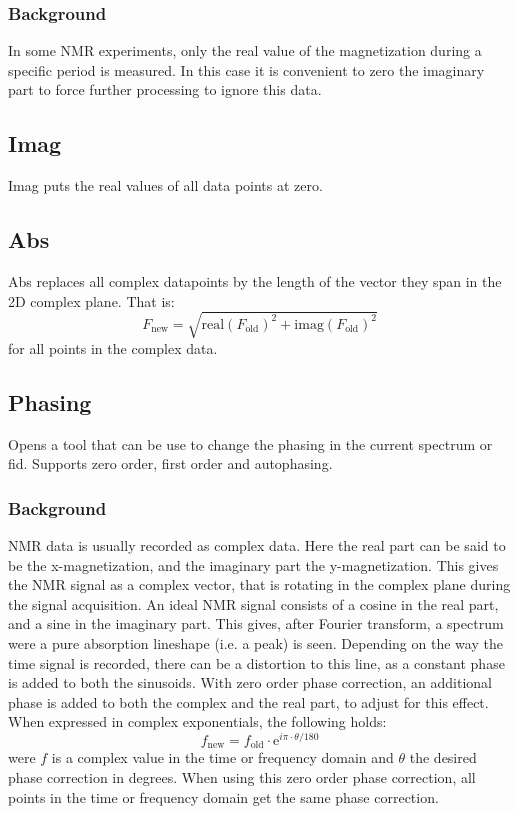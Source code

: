\documentclass[11pt,a4paper]{article}
\begin{document}
\subsubsection*{Background}
In some NMR experiments, only the real value of the magnetization during a specific period is measured. In this case it is convenient to zero the imaginary part to force further processing to ignore this data.


\subsection{Imag}
Imag puts the real values of all data points at zero.

\subsection{Abs}
Abs replaces all complex datapoints by the length of the vector they span in the 2D complex plane. That is:
\begin{equation*}
F_\text{new} = \sqrt{\text{real}(F_\text{old})^2 + \text{imag}(F_\text{old})^2}
\end{equation*}
for all points in the complex data.

\subsection{Phasing}
Opens a tool that can be use to change the phasing in the current spectrum or fid. Supports zero order, first order and autophasing.

\subsubsection*{Background}
NMR data is usually recorded as complex data. Here the real part can be said to be the x-magnetization, and the imaginary part the y-magnetization. This gives the NMR signal as a complex vector, that is rotating in the complex plane during the signal acquisition. An ideal NMR signal consists of a cosine in the real part, and a sine in the imaginary part. This gives, after Fourier transform, a spectrum were a pure absorption lineshape (i.e. a peak) is seen. Depending on the way the time signal is recorded, there can be a distortion to this line, as a constant phase is added to both the sinusoids. With zero order phase correction, an additional phase is added to both the complex and the real part, to adjust for this effect. When expressed in complex exponentials, the following holds:
\begin{equation}
f_\text{new} = f_\text{old}\cdot\text{e}^{i\pi\cdot\theta/180} 
\end{equation}
were $f$ is a complex value in the time or frequency domain and $\theta$ the desired phase correction in degrees. When using this zero order phase correction, all points in the time or frequency domain get the same phase correction.
\end{document}
